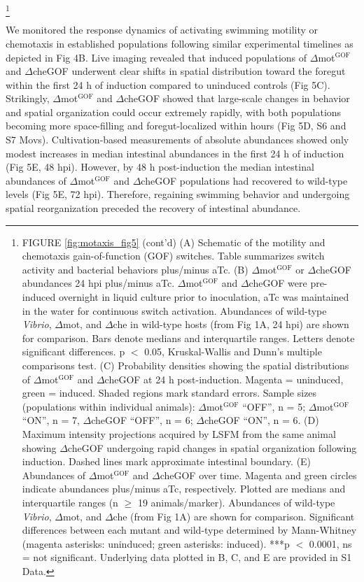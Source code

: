 {{{{{\let\thefootnote\relax\footnote{FIGURE \ref{fig:motaxis_fig5} (cont'd) (A) Schematic of the motility and chemotaxis gain-of-function (GOF) switches. Table summarizes switch activity and bacterial behaviors plus/minus aTc. (B) $\Delta$mot$^{\text{GOF}}$ or $\Delta$cheGOF abundances 24 hpi plus/minus aTc. $\Delta$mot$^{\text{GOF}}$ and $\Delta$cheGOF were pre-induced overnight in liquid culture prior to inoculation, aTc was maintained in the water for continuous switch activation. Abundances of wild-type \textit{Vibrio}, $\Delta$mot, and $\Delta$che in wild-type hosts (from Fig 1A, 24 hpi) are shown for comparison. Bars denote medians and interquartile ranges. Letters denote significant differences. p $ < $ 0.05, Kruskal-Wallis and Dunn's multiple comparisons test. (C) Probability densities showing the spatial distributions of $\Delta$mot$^{\text{GOF}}$ and $\Delta$cheGOF at 24 h post-induction. Magenta = uninduced, green = induced. Shaded regions mark standard errors. Sample sizes (populations within individual animals): $\Delta$mot$^{\text{GOF}}$ ``OFF'', n = 5; $\Delta$mot$^{\text{GOF}}$ ``ON'', n = 7, $\Delta$cheGOF ``OFF'', n = 6; $\Delta$cheGOF ``ON'', n = 6. (D) Maximum intensity projections acquired by LSFM from the same animal showing $\Delta$cheGOF undergoing rapid changes in spatial organization following induction. Dashed lines mark approximate intestinal boundary. (E) Abundances of $\Delta$mot$^{\text{GOF}}$ and $\Delta$cheGOF over time. Magenta and green circles indicate abundances plus/minus aTc, respectively. Plotted are medians and interquartile ranges (n $\ge$ 19 animals/marker). Abundances of wild-type \textit{Vibrio}, $\Delta$mot, and $\Delta$che (from Fig 1A) are shown for comparison. Significant differences between each mutant and wild-type determined by Mann-Whitney (magenta asterisks: uninduced; green asterisks: induced). ***p $ < $ 0.0001, ns = not significant. Underlying data plotted in B, C, and E are provided in S1 Data.}

We monitored the response dynamics of activating swimming motility or chemotaxis in established populations following similar experimental timelines as depicted in Fig 4B. Live imaging revealed that induced populations of $\Delta$mot$^{\text{GOF}}$ and $\Delta$cheGOF underwent clear shifts in spatial distribution toward the foregut within the first 24 h of induction compared to uninduced controls (Fig 5C). Strikingly, $\Delta$mot$^{\text{GOF}}$ and $\Delta$cheGOF showed that large-scale changes in behavior and spatial organization could occur extremely rapidly, with both populations becoming more space-filling and foregut-localized within hours (Fig 5D, S6 and S7 Movs). Cultivation-based measurements of absolute abundances showed only modest increases in median intestinal abundances in the first 24 h of induction (Fig 5E, 48 hpi). However, by 48 h post-induction the median intestinal abundances of $\Delta$mot$^{\text{GOF}}$ and $\Delta$cheGOF populations had recovered to wild-type levels (Fig 5E, 72 hpi). Therefore, regaining swimming behavior and undergoing spatial reorganization preceded the recovery of intestinal abundance. 

}}}}}
